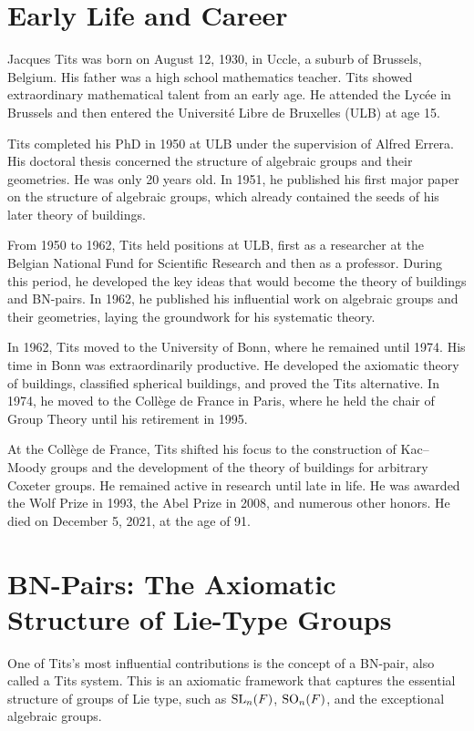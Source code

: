 \section{Early Life and Career}

Jacques Tits was born on August 12, 1930, in Uccle, a suburb of Brussels, Belgium. His father was a high school mathematics teacher. Tits showed extraordinary mathematical talent from an early age. He attended the Lyc\'ee in Brussels and then entered the Universit\'e Libre de Bruxelles (ULB) at age 15.

Tits completed his PhD in 1950 at ULB under the supervision of Alfred Errera. His doctoral thesis concerned the structure of algebraic groups and their geometries. He was only 20 years old. In 1951, he published his first major paper on the structure of algebraic groups, which already contained the seeds of his later theory of buildings.

From 1950 to 1962, Tits held positions at ULB, first as a researcher at the Belgian National Fund for Scientific Research and then as a professor. During this period, he developed the key ideas that would become the theory of buildings and BN-pairs. In 1962, he published his influential work on algebraic groups and their geometries, laying the groundwork for his systematic theory.

In 1962, Tits moved to the University of Bonn, where he remained until 1974. His time in Bonn was extraordinarily productive. He developed the axiomatic theory of buildings, classified spherical buildings, and proved the Tits alternative. In 1974, he moved to the Coll\`ege de France in Paris, where he held the chair of Group Theory until his retirement in 1995.

At the Coll\`ege de France, Tits shifted his focus to the construction of Kac--Moody groups and the development of the theory of buildings for arbitrary Coxeter groups. He remained active in research until late in life. He was awarded the Wolf Prize in 1993, the Abel Prize in 2008, and numerous other honors. He died on December 5, 2021, at the age of 91.

\section{BN-Pairs: The Axiomatic Structure of Lie-Type Groups}

One of Tits's most influential contributions is the concept of a BN-pair, also called a Tits system. This is an axiomatic framework that captures the essential structure of groups of Lie type, such as \(\operatorname{SL}_n(F)\), \(\operatorname{SO}_n(F)\), and the exceptional algebraic groups.

